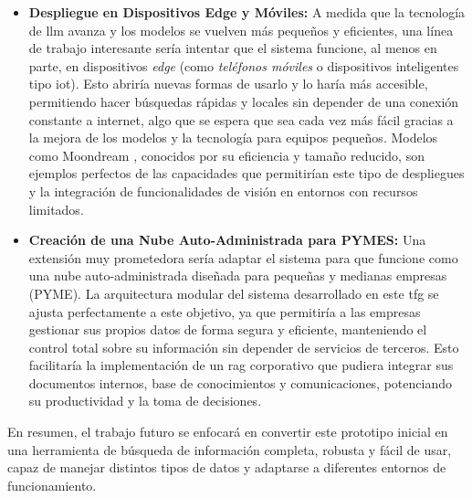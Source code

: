 \begin{itemize}
\item \textbf{Despliegue en Dispositivos Edge y Móviles:} A medida que la tecnología de \gls{llm} avanza y los modelos se vuelven más pequeños y eficientes, una línea de trabajo interesante sería intentar que el sistema funcione, al menos en parte, en dispositivos \textit{edge} (como \textit{teléfonos móviles} o dispositivos inteligentes tipo \gls{iot}). Esto abriría nuevas formas de usarlo y lo haría más accesible, permitiendo hacer búsquedas rápidas y locales sin depender de una conexión constante a internet, algo que se espera que sea cada vez más fácil gracias a la mejora de los modelos y la tecnología para equipos pequeños. Modelos como Moondream \citep{noauthor_moondream_nodate}, conocidos por su eficiencia y tamaño reducido, son ejemplos perfectos de las capacidades que permitirían este tipo de despliegues y la integración de funcionalidades de visión en entornos con recursos limitados.
\item \textbf{Creación de una Nube Auto-Administrada para PYMES:} Una extensión muy prometedora sería adaptar el sistema para que funcione como una nube auto-administrada diseñada para pequeñas y medianas empresas (PYME). La arquitectura modular del sistema desarrollado en este \gls{tfg} se ajusta perfectamente a este objetivo, ya que permitiría a las empresas gestionar sus propios datos de forma segura y eficiente, manteniendo el control total sobre su información sin depender de servicios de terceros. Esto facilitaría la implementación de un \gls{rag} corporativo que pudiera integrar sus documentos internos, base de conocimientos y comunicaciones, potenciando su productividad y la toma de decisiones.
\end{itemize}

En resumen, el trabajo futuro se enfocará en convertir este prototipo inicial en una herramienta de búsqueda de información completa, robusta y fácil de usar, capaz de manejar distintos tipos de datos y adaptarse a diferentes entornos de funcionamiento.